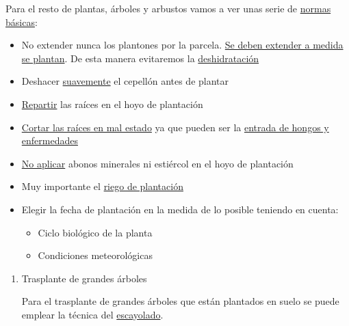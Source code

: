 \documentclass[a4paper,12pt,oneside]{article}
\begin{document}
\begin{enumerate}
Para el resto de plantas, árboles y arbustos vamos a ver unas serie de \uline{normas
básicas}:
\begin{itemize}
\item No extender nunca los plantones por la parcela. \uline{Se deben extender a medida se
plantan}. De esta manera evitaremos la \uline{deshidratación}
\item Deshacer \uline{suavemente} el cepellón antes de plantar
\item \uline{Repartir} las raíces en el hoyo de plantación
\item \uline{Cortar las raíces en mal estado} ya que pueden ser la \uline{entrada de hongos y
enfermedades}
\item \uline{No aplicar} abonos minerales ni estiércol en el hoyo de plantación
\item Muy importante el \uline{riego de plantación}
\item Elegir la fecha de plantación en la medida de lo posible teniendo en cuenta:
\begin{itemize}
\item Ciclo biológico de la planta
\item Condiciones meteorológicas
\end{itemize}
\end{itemize}

\begin{enumerate}
\item Trasplante de grandes árboles
\label{sec:org411a18d}

Para el trasplante de grandes árboles que están plantados en suelo se puede
emplear la técnica del \uline{escayolado}.


\end{enumerate}
\end{enumerate}
\end{document}
